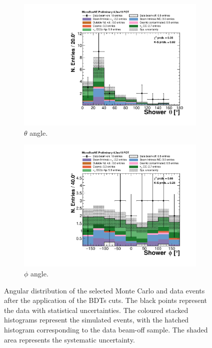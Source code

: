\begin{figure}[htbp]
\centering
  \begin{subfigure}{0.48\textwidth}
    \includegraphics[width=\linewidth]{figures/theta_bdt.pdf}
    \caption{$\theta$ angle.} 
  \end{subfigure}
    \begin{subfigure}{0.48\textwidth}
    \includegraphics[width=\linewidth]{figures/phi_bdt.pdf}
    \caption{$\phi$ angle.} 
  \end{subfigure}
  \caption{Angular distribution of the selected Monte Carlo and data events after the application of the BDTs cuts.  The black points represent the data with statistical uncertainties. The coloured stacked histograms represent the simulated events, with the hatched histogram corresponding to the data beam-off sample. The shaded area represents the systematic uncertainty.}
  \label{fig:angle_bdt}
\end{figure}

